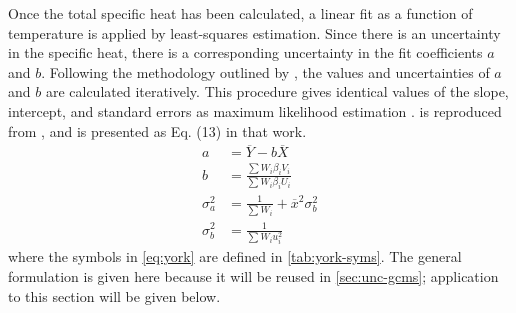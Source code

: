 \documentclass[../main.tex]{subfiles}
\begin{document}
Once the total specific heat has been calculated, a linear fit as a function
of temperature is applied by least-squares estimation. Since there is an uncertainty
in the specific heat, there is a corresponding uncertainty in the fit
coefficients $a$ and $b$. Following the methodology outlined by
\textcite{York2004}, the values and uncertainties of $a$ and $b$
are calculated iteratively. This procedure gives identical values of the
slope, intercept, and standard errors as maximum likelihood estimation \cite{York2004}.
 is reproduced from \textcite{York2004}, and is presented
as Eq. (13) in that work.
%
\begin{subequations}
\label{eq:york}
\begin{align}
a &= \overline{Y} - b\overline{X}  \label{eq:intercept}\\
b &= \frac{\sum W_i \beta_i V_i}{\sum W_i \beta_i U_i} \label{eq:slope}\\
\sigma_a^2 &= \frac{1}{\sum W_i} + \overline{x}^2\sigma_b^2 \label{eq:unc-intercept}\\
\sigma_b^2 &= \frac{1}{\sum W_i u_i^2} \label{eq:unc-slope}
\end{align}
\end{subequations}
%
where the symbols in \cref{eq:york} are defined in \cref{tab:york-syms}.
The general formulation is given here because it will be reused in
\cref{sec:unc-gcms}; application to this section will
be given below.
\end{document}
